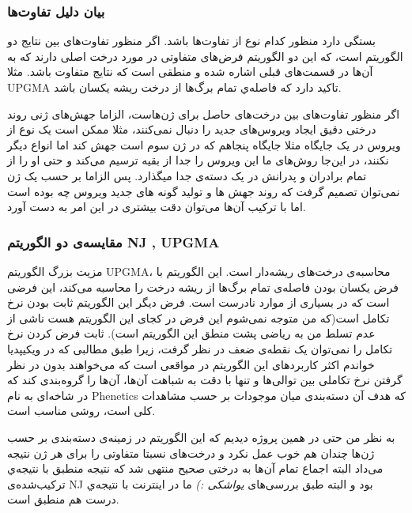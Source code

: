 \documentclass[11pt]{article}
\begin{document}
\subsubsection{بیان دلیل تفاوت‌ها}
بستگی دارد منظور کدام نوع از تفاوت‌ها باشد. اگر منظور تفاوت‌های بین نتایج دو الگوریتم است، که این دو الگوریتم فرض‌های متفاوتی در مورد درخت اصلی دارند که به آن‌ها در قسمت‌های قبلی اشاره شده و منطقی است که نتایج متفاوت باشد. مثلا UPGMA تاکید دارد که فاصله‌ي تمام برگ‌ها از درخت ریشه یکسان باشد.

اگر منظور تفاوت‌‌های بین درخت‌های حاصل برای ژن‌هاست، الزاما جهش‌های ژنی روند درختی دقیق ایجاد ویروس‌های جدید را دنبال نمی‌کنند، مثلا ممکن است یک نوع از ویروس در یک جایگاه مثلا جایگاه پنجاهم که در ژن سوم است جهش کند اما انواع دیگر نکنند، در این‌جا روش‌های ما این ویروس را جدا از بقیه ترسیم می‌کند و حتی او را از تمام برادران و پدرانش در یک دسته‌ی جدا میگذارد. پس الزاما بر حسب یک ژن نمی‌توان تصمیم گرفت که روند جهش ها و تولید گونه های جدید ویروس چه بوده است اما با ترکیب آن‌ها می‌توان دقت بیشتری در این امر به دست آورد.
\subsubsection{مقایسه‌ی دو الگوریتم NJ , UPGMA}
مزیت بزرگ الگوریتم UPGMA، محاسبه‌ی درخت‌های ریشه‌دار است. این الگوریتم با فرض یکسان بودن فاصله‌ی تمام برگ‌ها از ریشه درخت را محاسبه می‌کند، این فرضی است که در بسیاری از موارد نادرست است. فرض دیگر این الگوریتم ثابت بودن نرخ تکامل است(که من متوجه نمی‌شوم این فرض در کجای این الگوریتم هست  ناشی از عدم تسلط من به ریاضی پشت منطق این الگوریتم است). ثابت فرض کردن نرخ تکامل را نمی‌توان یک نقطه‌ی ضعف در نظر گرفت، زیرا طبق مطالبی که در ویکیپدیا خواندم اکثر کاربرد‌های این الگوریتم در مواقعی است که می‌خواهند بدون در نظر گرفتن نرخ تکاملی بین توالی‌ها و تنها با دقت به شباهت‌ آن‌ها، آن‌ها را گروه‌بندی کند که در شاخه‌ای به نام Phenetics که هدف آن دسته‌بندی میان موجودات بر حسب مشاهدات کلی است، روشی مناسب است.

به نظر من حتی در همین پروژه دیدیم که این الگوریتم در زمینه‌ی دسته‌بندی بر حسب ژن‌ها چندان هم خوب عمل نکرد و درخت‌های نسبتا متفاوتی را برای هر ژن نتیجه می‌داد  البته اجماع تمام آن‌ها به درختی صحیح منتهی شد که  نتیجه منطبق با نتیجه‌ي ترکیب‌شده‌ی NJ بود و البته طبق بررسی‌های
 \textit{
 یواشکی :)
 }
 ما در اینترنت با نتیجه‌ي درست هم منطبق است. 
\end{document}
